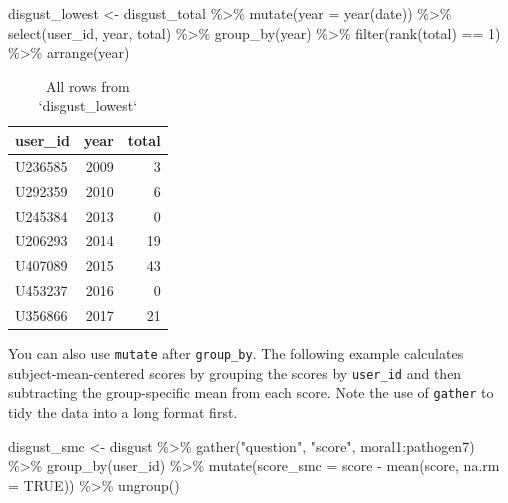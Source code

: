 \documentclass[
  oneside]{book}
\newenvironment{Shaded}{\begin{snugshade}}{\end{snugshade}}
\newcommand{\AttributeTok}[1]{\textcolor[rgb]{0.77,0.63,0.00}{#1}}
\newcommand{\ConstantTok}[1]{\textcolor[rgb]{0.00,0.00,0.00}{#1}}
\newcommand{\DecValTok}[1]{\textcolor[rgb]{0.00,0.00,0.81}{#1}}
\newcommand{\FunctionTok}[1]{\textcolor[rgb]{0.00,0.00,0.00}{#1}}
\newcommand{\NormalTok}[1]{#1}
\newcommand{\OtherTok}[1]{\textcolor[rgb]{0.56,0.35,0.01}{#1}}
\newcommand{\SpecialCharTok}[1]{\textcolor[rgb]{0.00,0.00,0.00}{#1}}
\newcommand{\StringTok}[1]{\textcolor[rgb]{0.31,0.60,0.02}{#1}}
\begin{document}
\begin{Shaded}
\begin{Highlighting}[]
\NormalTok{disgust\_lowest }\OtherTok{\textless{}{-}}\NormalTok{ disgust\_total }\SpecialCharTok{\%\textgreater{}\%}
  \FunctionTok{mutate}\NormalTok{(}\AttributeTok{year =} \FunctionTok{year}\NormalTok{(date)) }\SpecialCharTok{\%\textgreater{}\%}
  \FunctionTok{select}\NormalTok{(user\_id, year, total) }\SpecialCharTok{\%\textgreater{}\%}
  \FunctionTok{group\_by}\NormalTok{(year) }\SpecialCharTok{\%\textgreater{}\%}
  \FunctionTok{filter}\NormalTok{(}\FunctionTok{rank}\NormalTok{(total) }\SpecialCharTok{==} \DecValTok{1}\NormalTok{) }\SpecialCharTok{\%\textgreater{}\%}
  \FunctionTok{arrange}\NormalTok{(year)}
\end{Highlighting}
\end{Shaded}

\begin{table}

\caption{\label{tab:group-by-filter}All rows from `disgust_lowest`}
\centering
\begin{tabular}[t]{l|r|r}
\hline
user\_id & year & total\\
\hline
U236585 & 2009 & 3\\
\hline
U292359 & 2010 & 6\\
\hline
U245384 & 2013 & 0\\
\hline
U206293 & 2014 & 19\\
\hline
U407089 & 2015 & 43\\
\hline
U453237 & 2016 & 0\\
\hline
U356866 & 2017 & 21\\
\hline
\end{tabular}
\end{table}

You can also use \texttt{mutate} after \texttt{group\_by}. The following example calculates subject-mean-centered scores by grouping the scores by \texttt{user\_id} and then subtracting the group-specific mean from each score. {Note the use of \texttt{gather} to tidy the data into a long format first.}

\begin{Shaded}
\begin{Highlighting}[]
\NormalTok{disgust\_smc }\OtherTok{\textless{}{-}}\NormalTok{ disgust }\SpecialCharTok{\%\textgreater{}\%}
  \FunctionTok{gather}\NormalTok{(}\StringTok{"question"}\NormalTok{, }\StringTok{"score"}\NormalTok{, moral1}\SpecialCharTok{:}\NormalTok{pathogen7) }\SpecialCharTok{\%\textgreater{}\%}
  \FunctionTok{group\_by}\NormalTok{(user\_id) }\SpecialCharTok{\%\textgreater{}\%}
  \FunctionTok{mutate}\NormalTok{(}\AttributeTok{score\_smc =}\NormalTok{ score }\SpecialCharTok{{-}} \FunctionTok{mean}\NormalTok{(score, }\AttributeTok{na.rm =} \ConstantTok{TRUE}\NormalTok{)) }\SpecialCharTok{\%\textgreater{}\%} 
  \FunctionTok{ungroup}\NormalTok{()}
\end{Highlighting}
\end{Shaded}
\end{document}
